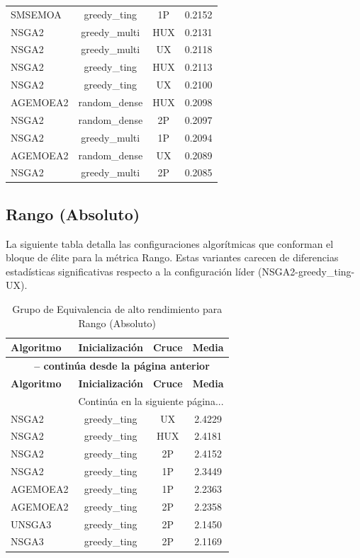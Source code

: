\begin{longtable}{lccc}
SMSEMOA & greedy\_ting & 1P & 0.2152 \\
NSGA2 & greedy\_multi & HUX & 0.2131 \\
NSGA2 & greedy\_multi & UX & 0.2118 \\
NSGA2 & greedy\_ting & HUX & 0.2113 \\
NSGA2 & greedy\_ting & UX & 0.2100 \\
AGEMOEA2 & random\_dense & HUX & 0.2098 \\
NSGA2 & random\_dense & 2P & 0.2097 \\
NSGA2 & greedy\_multi & 1P & 0.2094 \\
AGEMOEA2 & random\_dense & UX & 0.2089 \\
NSGA2 & greedy\_multi & 2P & 0.2085 \\
\end{longtable}

\subsection{Rango (Absoluto)}\label{anexo:elite_range}

La siguiente tabla detalla las configuraciones algorítmicas que conforman el bloque de élite para la métrica Rango. Estas variantes carecen de diferencias estadísticas significativas respecto a la configuración líder (NSGA2-greedy\_ting-UX).

\begin{longtable}{lccc}
    \caption{Grupo de Equivalencia de alto rendimiento para Rango (Absoluto)}
    \label{tab:range_ranking} \\
    \toprule
    \textbf{Algoritmo} & \textbf{Inicialización} & \textbf{Cruce} & \textbf{Media} \\
    \midrule
    \endfirsthead
    \multicolumn{4}{c}{{\bfseries \tablename\ \thetable{} -- continúa desde la página anterior}} \\
    \toprule
    \textbf{Algoritmo} & \textbf{Inicialización} & \textbf{Cruce} & \textbf{Media} \\
    \midrule
    \endhead
    \midrule \multicolumn{4}{r}{{Continúa en la siguiente página...}} \\
    \endfoot
    \bottomrule
    \endlastfoot
    NSGA2 & greedy\_ting & UX & 2.4229 \\
NSGA2 & greedy\_ting & HUX & 2.4181 \\
NSGA2 & greedy\_ting & 2P & 2.4152 \\
NSGA2 & greedy\_ting & 1P & 2.3449 \\
AGEMOEA2 & greedy\_ting & 1P & 2.2363 \\
AGEMOEA2 & greedy\_ting & 2P & 2.2358 \\
UNSGA3 & greedy\_ting & 2P & 2.1450 \\
NSGA3 & greedy\_ting & 2P & 2.1169 \\
\end{longtable}

